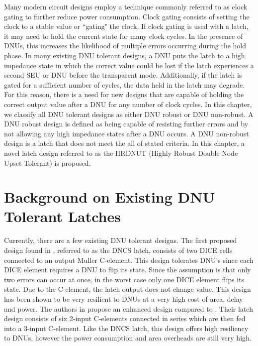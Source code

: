 Many modern circuit designs employ a technique commonly referred to as clock gating to further reduce power consumption. Clock gating consists of setting the clock to a stable value or ``gating" the clock. If clock gating is used with a latch, it may need to hold the current state for many clock cycles. In the presence of DNUs, this increases the likelihood of multiple errors occurring during the hold phase. In many existing DNU tolerant designs, a DNU puts the latch to a high impedance state in which the correct value could be lost if the latch experiences a second SEU or DNU before the transparent mode. Additionally, if the latch is gated for a sufficient number of cycles, the data held in the latch may degrade. For this reason, there is a need for new designs that are capable of holding the correct output value after a DNU for any number of clock cycles. In this chapter, we classify all DNU tolerant designs as either DNU robust or DNU non-robust. A DNU robust design is defined as being capable of resisting further errors and by not allowing any high impedance states after a DNU occurs. A DNU non-robust design is a latch that does not meet the all of stated criteria. In this chapter, a novel latch design referred to as the HRDNUT (Highly Robust Double Node Upset Tolerant) is proposed.

\section{Background on Existing DNU Tolerant Latches} \label{sec:DNUex}

Currently, there are a few existing DNU tolerant designs. The first proposed design found in \cite{DNCS}, referred to as the DNCS latch, consists of two DICE cells connected to an output Muller C-element. This design tolerates DNU's since each DICE element requires a DNU to flip its state. Since the assumption is that only two errors can occur at once, in the worst case only one DICE element flips its state. Due to the C-element, the latch output does not change value. This design has been shown to be very resilient to DNUs at a very high cost of area, delay and power. The authors in \cite{Inter} propose an enhanced design compared to \cite{DNCS}. Their latch design consists of six 2-input C-elements connected in series which are then fed into a 3-input C-element. Like the DNCS latch, this design offers high resiliency to DNUs, however the power consumption and area overheads are still very high. 


